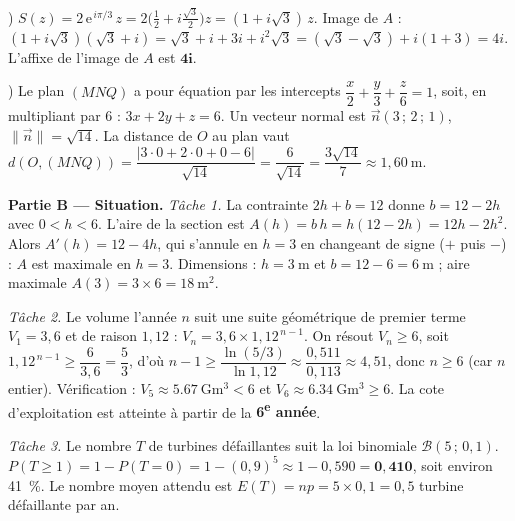 ) $S(z)=2\,\mathrm{e}^{\,i\pi/3}\,z=2\big(\tfrac12+i\tfrac{\sqrt3}{2}\big)z=(1+i\sqrt3)\,z$.
Image de $A$ : $(1+i\sqrt3)(\sqrt3+i)=\sqrt3+i+3i+i^2\sqrt3=(\sqrt3-\sqrt3)+i(1+3)=4i$.
L'affixe de l'image de $A$ est $\mathbf{4i}$.

) Le plan $(MNQ)$ a pour équation par les intercepts $\dfrac x2+\dfrac y3+\dfrac z6=1$,
soit, en multipliant par $6$ : $3x+2y+z=6$. Un vecteur normal est $\vec n(3\,;\,2\,;\,1)$, $\|\vec n\|=\sqrt{14}$.
La distance de $O$ au plan vaut $d(O,(MNQ))=\dfrac{|3\cdot0+2\cdot0+0-6|}{\sqrt{14}}=\dfrac{6}{\sqrt{14}}=\dfrac{3\sqrt{14}}{7}\approx1{,}60\ \text{m}$.

\smallskip
\noindent\textbf{Partie B — Situation.}
\emph{Tâche 1.} La contrainte $2h+b=12$ donne $b=12-2h$ avec $0<h<6$. L'aire de la section est
$A(h)=b\,h=h(12-2h)=12h-2h^2$. Alors $A'(h)=12-4h$, qui s'annule en $h=3$ en changeant de signe
($+$ puis $-$) : $A$ est maximale en $h=3$. Dimensions : $h=\SI{3}{\metre}$ et $b=12-6=\SI{6}{\metre}$ ;
aire maximale $A(3)=3\times6=\SI{18}{\metre\squared}$.

\emph{Tâche 2.} Le volume l'année $n$ suit une suite géométrique de premier terme $V_1=3{,}6$ et de
raison $1{,}12$ : $V_n=3{,}6\times1{,}12^{\,n-1}$. On résout $V_n\ge6$, soit $1{,}12^{\,n-1}\ge\dfrac{6}{3{,}6}=\dfrac53$,
d'où $n-1\ge\dfrac{\ln(5/3)}{\ln1{,}12}\approx\dfrac{0{,}511}{0{,}113}\approx4{,}51$, donc $n\ge6$ (car $n$ entier).
Vérification : $V_5\approx\SI{5,67}{\giga\metre\cubed}<6$ et $V_6\approx\SI{6,34}{\giga\metre\cubed}\ge6$.
La cote d'exploitation est atteinte à partir de la \textbf{6\textsuperscript{e} année}.

\emph{Tâche 3.} Le nombre $T$ de turbines défaillantes suit la loi binomiale $\mathcal{B}(5\,;\,0{,}1)$.
$P(T\ge1)=1-P(T=0)=1-(0{,}9)^5\approx1-0{,}590=\mathbf{0{,}410}$, soit environ \SI{41}{\percent}.
Le nombre moyen attendu est $E(T)=np=5\times0{,}1=0{,}5$ turbine défaillante par an.
